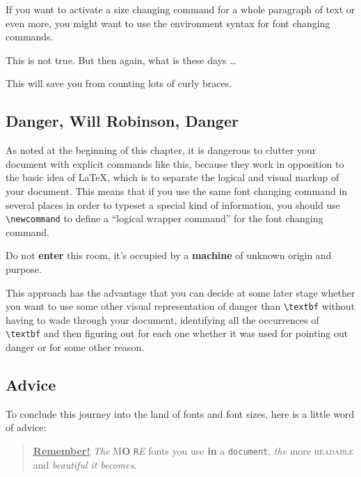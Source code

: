 If you want to activate a size changing command for a whole paragraph
of text or even more, you might want to use the environment syntax for
font changing commands.

\begin{example}
\begin{Large} 
This is not true.
But then again, what is these
days \ldots
\end{Large}
\end{example}

\noindent This will save you from counting lots of curly braces.

\subsection{Danger, Will Robinson, Danger}

As noted at the beginning of this chapter, it is dangerous to clutter
your document with explicit commands like this, because they work in
opposition to the basic idea of \LaTeX{}, which is to separate the
logical and visual markup of your document.  This means that if you
use the same font changing command in several places in order to
typeset a special kind of information, you should use
\verb|\newcommand| to define a ``logical wrapper command'' for the font
changing command.

\begin{example}
\newcommand{\oops}[1]{\textbf{#1}}
Do not \oops{enter} this room,
it's occupied by a \oops{machine}
of unknown origin and purpose.
\end{example}

This approach has the advantage that you can decide at some later
stage whether you want to use some other visual representation of danger
than \verb|\textbf| without having to wade through your document,
identifying all the occurrences of \verb|\textbf| and then figuring out
for each one whether it was used for pointing out danger or for some other
reason.


\subsection{Advice}

To conclude this journey into the land of fonts and font sizes,
here is a little word of advice:\nopagebreak

\begin{quote}
  \underline{\textbf{Remember\Huge!}} \textit{The}
  \textsf{M\textbf{\LARGE O} \texttt{R}\textsl{E}} fonts \Huge you
  \tiny use \footnotesize \textbf{in} a \small \texttt{document},
  \large \textit{the} \normalsize more \textsc{readable} and
  \textsl{\textsf{beautiful} it bec\large o\Large m\LARGE e\huge s}.
\end{quote}

